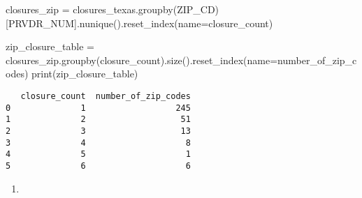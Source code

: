 \documentclass[
  letterpaper,
  DIV=11,
  numbers=noendperiod]{scrartcl}
\newenvironment{Shaded}{\begin{snugshade}}{\end{snugshade}}
\newcommand{\BuiltInTok}[1]{\textcolor[rgb]{0.00,0.23,0.31}{#1}}
\newcommand{\NormalTok}[1]{\textcolor[rgb]{0.00,0.23,0.31}{#1}}
\newcommand{\OperatorTok}[1]{\textcolor[rgb]{0.37,0.37,0.37}{#1}}
\newcommand{\StringTok}[1]{\textcolor[rgb]{0.13,0.47,0.30}{#1}}
\providecommand{\tightlist}{%
  \setlength{\itemsep}{0pt}\setlength{\parskip}{0pt}}\usepackage{longtable,booktabs,array}
\begin{document}
\begin{Shaded}
\begin{Highlighting}[]
\NormalTok{closures\_zip }\OperatorTok{=}\NormalTok{ closures\_texas.groupby(}\StringTok{\textquotesingle{}ZIP\_CD\textquotesingle{}}\NormalTok{)[}\StringTok{\textquotesingle{}PRVDR\_NUM\textquotesingle{}}\NormalTok{].nunique().reset\_index(name}\OperatorTok{=}\StringTok{\textquotesingle{}closure\_count\textquotesingle{}}\NormalTok{)}

\NormalTok{zip\_closure\_table }\OperatorTok{=}\NormalTok{ closures\_zip.groupby(}\StringTok{\textquotesingle{}closure\_count\textquotesingle{}}\NormalTok{).size().reset\_index(name}\OperatorTok{=}\StringTok{\textquotesingle{}number\_of\_zip\_codes\textquotesingle{}}\NormalTok{)}
\BuiltInTok{print}\NormalTok{(zip\_closure\_table)}
\end{Highlighting}
\end{Shaded}

\begin{verbatim}
   closure_count  number_of_zip_codes
0              1                  245
1              2                   51
2              3                   13
3              4                    8
4              5                    1
5              6                    6
\end{verbatim}

\begin{enumerate}
\def\labelenumi{\arabic{enumi}.}
\setcounter{enumi}{1}
\tightlist
\item
\end{enumerate}
\end{document}
